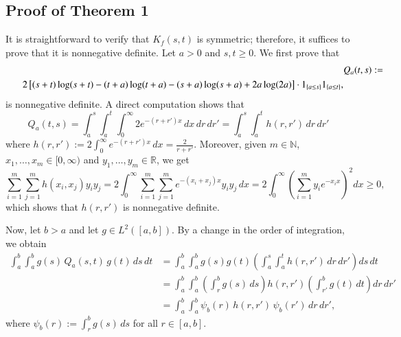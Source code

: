 \documentclass[preprint,12pt,authoryear]{elsarticle}
\begin{document}
\subsection*{Proof of Theorem 1} 
It is straightforward to verify that \( K_f(s,t) \) is symmetric; therefore, it suffices to prove that it is nonnegative definite. Let \( a > 0 \) and \( s, t \geq 0 \). We first prove that
\small
\begin{eqnarray*}
&&\lefteqn{Q_a(t,s) :=} \\
&&2\left[(s+t)\log(s+t) - (t+a)\log(t+a) - (s+a)\log(s+a) + 2a\log(2a)\right] \cdot 1_{\{a \leq s\}} 1_{\{a \leq t\}},
\end{eqnarray*}
\normalsize
is nonnegative definite.  A direct computation shows that
\small
\begin{equation}\label{PDQ_a}
 Q_a(t,s) = \int_a^s \int_a^t \int_0^\infty 2 e^{-(r + r')x} \, dx \, dr \, dr' =\int_a^s \int_a^t h(r,r') \, dr \, dr'
\end{equation}
\normalsize
where \( h(r,r') := 2\int_0^\infty e^{-(r + r')x} \, dx = \frac{2}{r+r'} \). Moreover, given \( m \in \mathbb{N} \),  \( x_1, \ldots, x_m \in [0,\infty) \) and  \( y_1, \ldots, y_m \in \mathbb{R} \), we get
\begin{equation}\label{h_nnd}
   \sum_{i=1}^m \sum_{j=1}^m h(x_i, x_j) y_i y_j = 2\int_0^\infty \sum_{i=1}^m \sum_{j=1}^m e^{-(x_i + x_j)x} y_i y_j \, dx = 2\int_0^\infty \left( \sum_{i=1}^{m} y_i e^{-x_i x} \right)^2 dx \geq 0,
\end{equation}
which shows that \( h(r,r') \) is nonnegative definite.

Now, let \( b > a \) and let \( g \in L^2([a,b]) \). By a change in the order of integration, we obtain
\small
\begin{equation}\label{PDQ_a2}
\begin{aligned}
\int_{a}^{b}\int_{a}^{b} g(s)\, Q_a(s,t)\, g(t)\, ds\, dt 
&= \int_{a}^{b}\int_{a}^{b} g(s)g(t)\left( \int_a^s \int_a^t h(r,r') \, dr \, dr' \right) ds\, dt \\
&= \int_{a}^{b}\int_{a}^{b} \left( \int_r^b g(s)\, ds \right) h(r,r') \left( \int_{r'}^b g(t)\, dt \right) dr\, dr' \\
&= \int_{a}^{b}\int_{a}^{b} \psi_b(r)\, h(r,r')\, \psi_b(r') \, dr\, dr',
\end{aligned}
\end{equation}
\normalsize
where \( \psi_b(r) := \int_r^b g(s)\, ds \) for all \( r \in [a,b] \).
\end{document}

